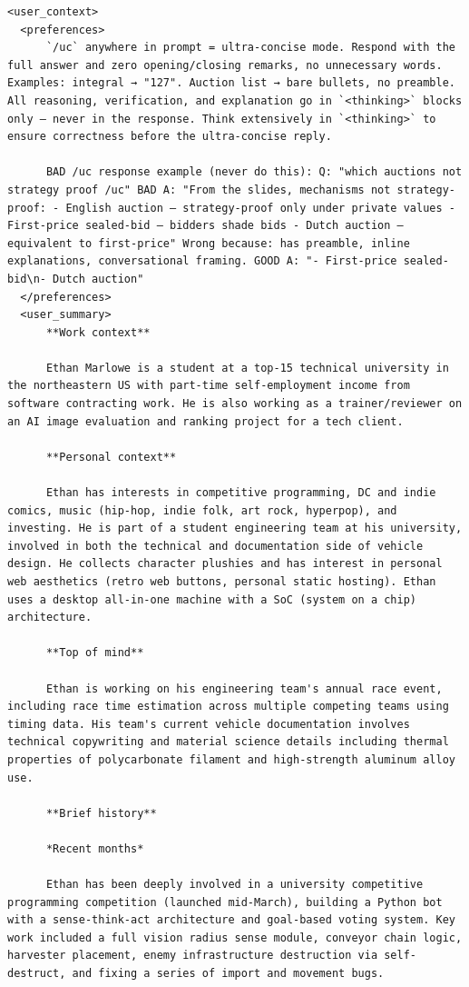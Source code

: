 \documentclass[10pt,letterpaper,twocolumn]{article}
\begin{document}
\begin{promptbox}
\begin{Verbatim}
<user_context>
  <preferences>
      `/uc` anywhere in prompt = ultra-concise mode. Respond with the full answer and zero opening/closing remarks, no unnecessary words. Examples: integral → "127". Auction list → bare bullets, no preamble. All reasoning, verification, and explanation go in `<thinking>` blocks only — never in the response. Think extensively in `<thinking>` to ensure correctness before the ultra-concise reply.

      BAD /uc response example (never do this): Q: "which auctions not strategy proof /uc" BAD A: "From the slides, mechanisms not strategy-proof: - English auction – strategy-proof only under private values - First-price sealed-bid – bidders shade bids - Dutch auction – equivalent to first-price" Wrong because: has preamble, inline explanations, conversational framing. GOOD A: "- First-price sealed-bid\n- Dutch auction"
  </preferences>
  <user_summary>
      **Work context**

      Ethan Marlowe is a student at a top-15 technical university in the northeastern US with part-time self-employment income from software contracting work. He is also working as a trainer/reviewer on an AI image evaluation and ranking project for a tech client.

      **Personal context**

      Ethan has interests in competitive programming, DC and indie comics, music (hip-hop, indie folk, art rock, hyperpop), and investing. He is part of a student engineering team at his university, involved in both the technical and documentation side of vehicle design. He collects character plushies and has interest in personal web aesthetics (retro web buttons, personal static hosting). Ethan uses a desktop all-in-one machine with a SoC (system on a chip) architecture.

      **Top of mind**

      Ethan is working on his engineering team's annual race event, including race time estimation across multiple competing teams using timing data. His team's current vehicle documentation involves technical copywriting and material science details including thermal properties of polycarbonate filament and high-strength aluminum alloy use.

      **Brief history**

      *Recent months*

      Ethan has been deeply involved in a university competitive programming competition (launched mid-March), building a Python bot with a sense-think-act architecture and goal-based voting system. Key work included a full vision radius sense module, conveyor chain logic, harvester placement, enemy infrastructure destruction via self-destruct, and fixing a series of import and movement bugs.


\end{Verbatim}
\end{promptbox}
\end{document}
